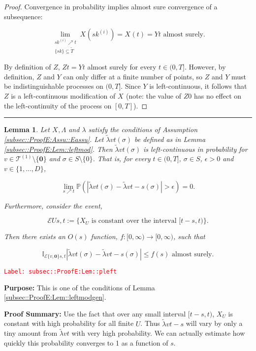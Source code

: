 \documentclass[12pt]{article}
\newcommand{\mb}{\mathbb}
\newcommand{\mc}{\mathcal}
\newcommand{\ra}{\rightarrow}
\newcommand{\te}{\text}
\newcommand{\ep}{\epsilon}
\newcommand{\tr}{\textcolor{red}}
\newcommand{\labe}[1]{\tr{\texttt{Label: #1}}}
\newcommand{\purpose}{\textbf{Purpose: }}
\newcommand{\pfsum}{\textbf{Proof Summary: }}
\newcommand{\lin}{\rule{\linewidth}{0.4 pt}}
\newcommand{\pr}{\mb{P}}							%
\renewcommand{\root}{\mathbf{0}}				%
\renewcommand{\v}{v}							%
\renewcommand{\U}{U}							%
\renewcommand{\S}{S}							%
\newcommand{\s}{\sigma}							%
\newcommand{\T}{T}								%
\renewcommand{\t}{t}							%
\renewcommand{\tt}{s}							%
\newcommand{\X}{X}								%
\newcommand{\cind}[1]{_{#1}}					%
\newcommand{\tp}[1]{(#1)}						%
\newcommand{\tip}[1]{#1}						%
\newcommand{\degr}{D}							%
\newcommand{\tree}{\mc{T}}						%
\newcommand{\sln}[1]{^{(#1)}}						%
\newcommand{\rate}{\lambda}						%
\newcommand{\alt}[1]{\widetilde{#1}}			%
\newcommand{\XX}{Y}								%
\newcommand{\XXX}{Z}							%
\renewcommand{\it}{k}							%
\newcommand{\evnt}{\mc{E}}						%
\newcommand{\Tset}{\alt{T}}						%
\newcommand{\ratee}{\Lambda}					%
\newcommand{\crate}{\alt{\lambda}}				%
\newtheorem{lem}[thms]{Lemma}
\begin{document}
\begin{proof}
Convergence in probability implies almost sure convergence of a subsequence:

\[\lim_{\substack{\tt{\it\sln{i}} \nearrow \t\\\{\tt{\it}\}\subseteq \Tset}} \X\cind{}\tp{\tt{\it\sln{i}}} = \X\cind{}\tp{\t} = \XX{}{\t} \te{ almost surely.}\]

By definition of \(\XXX{}{}\), \(\XXX{}{\t} = \XX{}{\t}\) almost surely for every \(\t \in (0,\T]\). However, by definition, \(\XXX{}{}\) and \(\XX{}{}\) can only differ at a finite number of points, so \(\XXX{}{}\) and \(\XX{}{}\) must be indistinguishable processes on \((0,\T]\). Since \(\XX{}{}\) is left-continuous, it follows that \(\XXX{}{}\) is a left-continuous modification of \(\X\cind{}\tip{}\) (note: the value of \(\XXX{}{0}\) has no effect on the left-continuity of the process on \([0,\T]\)).
\end{proof}

\lin

\begin{lem}
Let \(\X\cind{}\tip{},\ratee{}{}\) and \(\rate{}\) satisfy the conditions of Assumption \ref{subsec::ProofE:Assu::Eassu}. Let \(\crate{\v}{\t}(\s)\) be defined as in Lemma \ref{subsec::ProofE:Lem::leftmod}. Then \(\crate{\v}{\t}(\s)\) is left-continuous in probability for \(\v \in \tree\sln{1}\setminus\{\root\}\) and \(\s \in \S\setminus\{0\}\). That is, for every \(\t \in (0,\T]\), \(\s \in \S\), \(\ep > 0\) and \(\v\in \{1,\dots,\degr\}\),

\[\lim_{\tt \nearrow \t}\pr\left(|\crate{\v}{\t}(\s)- \crate{\v}{\t-\tt}(\s)| > \ep\right) = 0.\]

Furthermore, consider the event,

\[\evnt{\U}{\tt,\t} := \{\X\cind{\U}\tip{} \te{ is constant over the interval } [\t-\tt,\t)\}.\]

Then there exists an \(O(\tt)\) function, \(f:[0,\infty)\ra[0,\infty)\), such that 

\[\mb{I}_{\evnt{\{\v,\root\}}{\tt,\t}}|\crate{\v}{\t}(\s) - \crate{\v}{\t-\tt}(\s)| \leq f(\tt) \te{ almost surely.}\]
\label{subsec::ProofE:Lem::pleft}
\end{lem}
\labe{subsec::ProofE:Lem::pleft}

\purpose This is one of the conditions of Lemma \ref{subsec::ProofE:Lem::leftmodgen}.

\pfsum Use the fact that over any small interval \([\t-\tt,\t)\), \(\X\cind{U}\) is constant with high probability for all finite \(U\). Thus \(\crate{v}{\t-\tt}\) will vary by only a tiny amount from \(\crate{v}{\t}\) with very high probability. We can actually estimate how quickly this probability converges to 1 as a function of \(s\).
\end{document}
